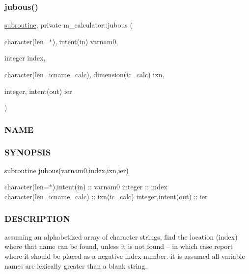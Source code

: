 \subsubsection{\texorpdfstring{jubous()}{jubous()}}
{\footnotesize\ttfamily \hyperlink{M__stopwatch_83_8txt_acfbcff50169d691ff02d4a123ed70482}{subroutine}, private m\+\_\+calculator\+::jubous (\begin{DoxyParamCaption}\item[{\hyperlink{option__stopwatch_83_8txt_abd4b21fbbd175834027b5224bfe97e66}{character}(len=$\ast$), intent(\hyperlink{M__journal_83_8txt_afce72651d1eed785a2132bee863b2f38}{in})}]{varnam0,  }\item[{integer}]{index,  }\item[{\hyperlink{option__stopwatch_83_8txt_abd4b21fbbd175834027b5224bfe97e66}{character}(len=\hyperlink{namespacem__calculator_a482f8880712dc8f52ef6833de3243875}{icname\+\_\+calc}), dimension(\hyperlink{namespacem__calculator_a462e5bf8d038196149ba96c22a614284}{ic\+\_\+calc})}]{ixn,  }\item[{integer, intent(out)}]{ier }\end{DoxyParamCaption})\hspace{0.3cm}{\ttfamily [private]}}



\subsubsection*{N\+A\+ME}

\subsubsection*{S\+Y\+N\+O\+P\+S\+IS}

subroutine jubous(varnam0,index,ixn,ier)

character(len=$\ast$),intent(in) \+:\+: varnam0 integer \+:\+: index character(len=icname\+\_\+calc) \+:\+: ixn(ic\+\_\+calc) integer,intent(out) \+:\+: ier \subsubsection*{D\+E\+S\+C\+R\+I\+P\+T\+I\+ON}

assuming an alphabetized array of character strings, find the location (index) where that name can be found, unless it is not found -- in which case report where it should be placed as a negative index number. it is assumed all variable names are lexically greater than a blank string.

